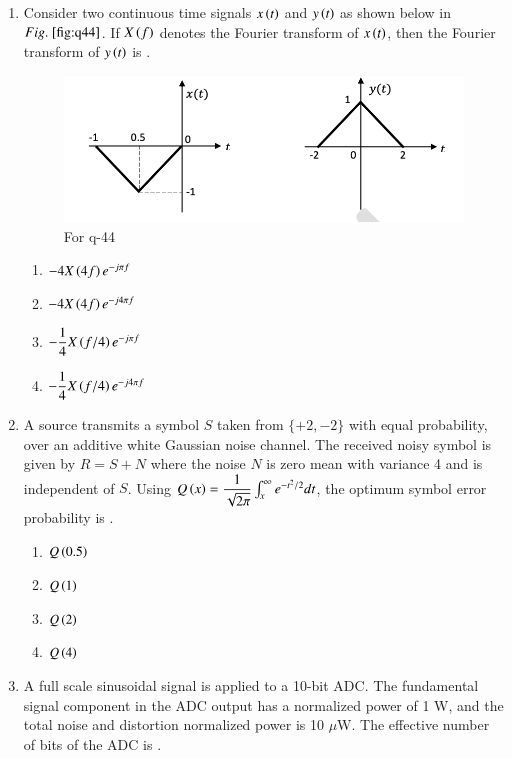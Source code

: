 \documentclass[journal,12pt,onecolumn]{IEEEtran}
\theoremstyle{remark}
\begin{document}
\begin{enumerate}
\item Consider two continuous time signals $x\left(t\right)$ and $y\left(t\right)$ as shown below in $\figref{fig:q44}$. If $X\left(f\right)$ denotes the Fourier transform of $x\left(t\right)$, then the Fourier transform of $y\left(t\right)$ is \underline{\hspace{2cm}}.
\begin{figure}[H]
    \centering
    \includegraphics[width=0.6\columnwidth]{q44.png}
    \caption{For q-44}
    \label{fig:q44}
\end{figure}
\hfill{}
\begin{multicols}{4}
   \begin{enumerate}
    \item $-4X\left(4f\right)e^{-j\pi f}$
    \item $-4X\left(4f\right)e^{-j4\pi f}$
    \item $-\dfrac{1}{4}X\left(f/4\right)e^{-j\pi f}$
    \item $-\dfrac{1}{4}X\left(f/4\right)e^{-j4\pi f}$
\end{enumerate} 
\end{multicols}


\item A source transmits a symbol $S$ taken from $\{+2, -2\}$ with equal probability, over an additive white Gaussian noise channel. The received noisy symbol is given by $R = S + N$ where the noise $N$ is zero mean with variance 4 and is independent of $S$. Using $Q\left(x\right) =\dfrac{1}{\sqrt{2\pi}}\int_x^\infty e^{-t^2/2}dt$, the optimum symbol error probability is \underline{\hspace{2cm}}.
\hfill{}
\begin{multicols}{4}
    \begin{enumerate}
    \item $Q\left(0.5\right)$
    \item $Q\left(1\right)$
    \item $Q\left(2\right)$
    \item $Q\left(4\right)$
\end{enumerate}
\end{multicols}


\item A full scale sinusoidal signal is applied to a 10-bit ADC. The fundamental signal component in the ADC output has a normalized power of 1 W, and the total noise and distortion normalized power is 10 $\mu$W. The effective number of bits   of the ADC is \underline{\hspace{2cm}}.


\end{enumerate}
\end{document}
